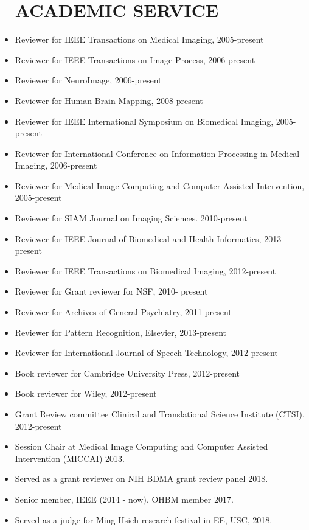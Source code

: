\documentclass[overlapped,line,letterpaper]{res}
\begin{document}
\begin{resume}
\begin{itemize}
\section{\bf ACADEMIC SERVICE}
\item Reviewer for IEEE Transactions on Medical Imaging, 2005-present
\item Reviewer for IEEE Transactions on Image Process,  2006-present 
\item Reviewer for NeuroImage,  2006-present
\item Reviewer for Human Brain Mapping,  2008-present 
\item  Reviewer for IEEE International Symposium on Biomedical Imaging,  2005-present
\item Reviewer for International Conference on Information Processing in Medical Imaging, 2006-present
\item Reviewer for Medical Image Computing and Computer Assisted Intervention, 2005-present 
\item Reviewer for SIAM Journal on Imaging Sciences. 2010-present
\item Reviewer for IEEE Journal of Biomedical and Health Informatics, 2013-present
\item Reviewer for IEEE Transactions on Biomedical Imaging, 2012-present
\item Reviewer for Grant reviewer for NSF, 2010- present 
\item Reviewer for Archives of General Psychiatry, 2011-present
\item Reviewer for Pattern Recognition, Elsevier, 2013-present
\item Reviewer for International Journal of Speech Technology, 2012-present
\item Book reviewer for Cambridge University Press, 2012-present
\item Book reviewer for Wiley, 2012-present
\item Grant Review committee Clinical and Translational Science Institute (CTSI), 2012-present
\item Session Chair at Medical Image Computing and Computer Assisted Intervention (MICCAI) 2013.
\item Served as a grant reviewer on NIH BDMA grant review panel 2018.
\item Senior member, IEEE (2014 - now), OHBM member 2017.
\item Served as a judge for Ming Hsieh research festival in EE, USC, 2018.

\end{itemize}


\end{resume}
\end{document}
